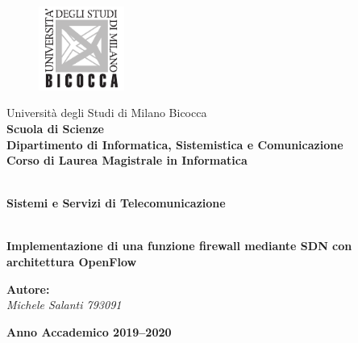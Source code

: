 \begin{titlepage}
\begin{onehalfspace}
	\begin{figure}
		\vspace*{-7mm}
		\centering
		\includegraphics[width=0.25\textwidth]{img/logo_unimib.pdf}
	\end{figure}
	\par
	\noindent Università degli Studi di Milano Bicocca \\
	\textbf{Scuola di Scienze \\
			Dipartimento di Informatica, Sistemistica e Comunicazione \\
			Corso di Laurea Magistrale in Informatica}
\end{onehalfspace}

\vfill
\par

\begin{doublespace}
\begin{center}
	{\Huge \textbf{\\Sistemi e Servizi di Telecomunicazione}}
\end{center}
\begin{center}
	{\Large \textbf{\\Implementazione di una funzione firewall mediante SDN con architettura OpenFlow}}
\end{center}
\end{doublespace}

\vfill
\par

\begin{onehalfspace}

\vspace{8mm}
\par

\begin{flushright}
	{\large \textbf{Autore:} \\
			\textit{Michele Salanti 793091}
	}
\end{flushright}
\end{onehalfspace}

\vfill
\par

\begin{center}
	{\large \textbf{Anno Accademico 2019--2020}}
\end{center}

\end{titlepage}
